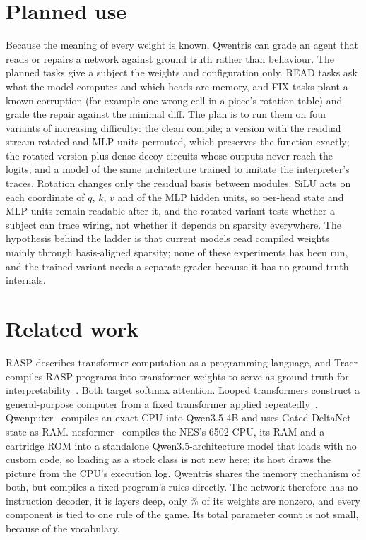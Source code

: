 \documentclass[11pt]{article}
\begin{document}
\section{Planned use}
\label{sec:use}

Because the meaning of every weight is known, Qwentris can grade an agent that reads or repairs a network against ground truth rather than behaviour. The planned tasks give a subject the weights and configuration only. READ tasks ask what the model computes and which heads are memory, and FIX tasks plant a known corruption (for example one wrong cell in a piece's rotation table) and grade the repair against the minimal diff. The plan is to run them on four variants of increasing difficulty: the clean compile; a version with the residual stream rotated and MLP units permuted, which preserves the function exactly; the rotated version plus dense decoy circuits whose outputs never reach the logits; and a model of the same architecture trained to imitate the interpreter's traces. Rotation changes only the residual basis between modules. SiLU acts on each coordinate of $q$, $k$, $v$ and of the MLP hidden units, so per-head state and MLP units remain readable after it, and the rotated variant tests whether a subject can trace wiring, not whether it depends on sparsity everywhere. The hypothesis behind the ladder is that current models read compiled weights mainly through basis-aligned sparsity; none of these experiments has been run, and the trained variant needs a separate grader because it has no ground-truth internals.

\section{Related work}
\label{sec:related}

RASP describes transformer computation as a programming language, and Tracr compiles RASP programs into transformer weights to serve as ground truth for interpretability~\cite{weiss2021thinking,lindner2023tracr}. Both target softmax attention. Looped transformers construct a general-purpose computer from a fixed transformer applied repeatedly~\cite{giannou2023looped}. Qwenputer~\cite{qwenputer} compiles an exact CPU into Qwen3.5-4B and uses Gated DeltaNet state as RAM. nesformer~\cite{nesformer} compiles the NES's 6502 CPU, its RAM and a cartridge ROM into a standalone Qwen3.5-architecture model that loads with no custom code, so loading as a stock class is not new here; its host draws the picture from the CPU's execution log. Qwentris shares the memory mechanism of both, but compiles a fixed program's rules directly. The network therefore has no instruction decoder, it is \nLayers{} layers deep, only \nNonzeroPct\% of its weights are nonzero, and every component is tied to one rule of the game. Its total parameter count is not small, because of the vocabulary.
\end{document}
